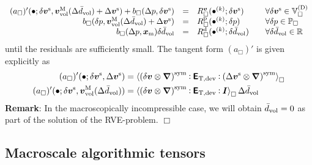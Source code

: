 \documentclass[10pt,a4paper]{article}
\newcommand{\ded}{\mathrm{d}}
\newcommand{\dep}{\mathrm{p}}
\begin{document}
\begin{equation}
\begin{array}{rcll}
    (a_\Box)'(\bullet; \delta\ta{v}^\fluct,\ta{v}^\macro_\vol(\Delta\bar{d}_\vol) + \Delta \ta{v}^\fluct)
    + b_\Box(\Delta p,\delta\ta{v}^\fluct)
    & = &
    R_\Box^{\ta v}(\bullet^{(k)}; \delta\ta{v}^\fluct)
    \quad & \forall \delta \ta{v}^\fluct\in\set{V}_\Box^{(\Dirichlet)}
    \\
    b_\Box(\delta p,\ta{v}^\macro_\vol(\Delta\bar{d}_\vol) + \Delta\ta{v}^\fluct)
    & = &
    R_\Box^\dep(\bullet^{(k)}; \delta p)
    \quad & \forall \delta p\in\set{P}_\Box
    \\
    b_\Box(\Delta p,\ta{x}_\mean)\delta\bar{d}_\vol
    & = &
    R_\Box^\ded(\bullet^{(k)}; \delta\bar{d}_\vol)
    \quad & \forall \delta\bar{d}_\vol  \in \set{R}
\end{array}
\label{eq252b}
\end{equation}
until the residuals are sufficiently small. The tangent form $(a_\Box)'$
is given explicitly as
\begin{align}
    (a_\Box)'(\bullet; \delta \boldsymbol{v}^{\mathrm{s}},\Delta{\boldsymbol{v}}^{\mathrm{s}})
    & = 
    \left\langle \left(\delta\boldsymbol{v}\mathbin{\otimes}\boldsymbol{\nabla}\right)^{\mathrm{sym}} \mathbin{\vcentcolon} \boldsymbol{\mathsf{E}}_{\mathrm{T},\mathrm{dev}} \mathbin{\vcentcolon}
    \left(\Delta\boldsymbol{v}^{\mathrm{s}}\mathbin{\otimes}\boldsymbol{\nabla}\right)^{\mathrm{sym}} \right\rangle_\Box
\label{eq253a} \\
    (a_\Box)'(\bullet; \delta \boldsymbol{v}^{\mathrm{s}},\boldsymbol{v}^{\mathrm{M}}_{\mathrm{vol}}(\Delta\bar{d}_{\mathrm{vol}}))
    & = 
    \left\langle \left(\delta\boldsymbol{v}\mathbin{\otimes}\boldsymbol{\nabla}\right)^{\mathrm{sym}} \mathbin{\vcentcolon} \boldsymbol{\mathsf{E}}_{\mathrm{T},\mathrm{dev}} \mathbin{\vcentcolon}
    \boldsymbol{I} \right\rangle_\Box\Delta\bar{d}_{\mathrm{vol}}
\label{eq253b}
\end{align}
\textbf{Remark}: In the macroscopically incompressible case, we will obtain $\bar{d}_{\mathrm{vol}}=0$ as part of the solution of the RVE-problem. $\Box$

\subsection{Macroscale algorithmic tensors}
\end{document}
